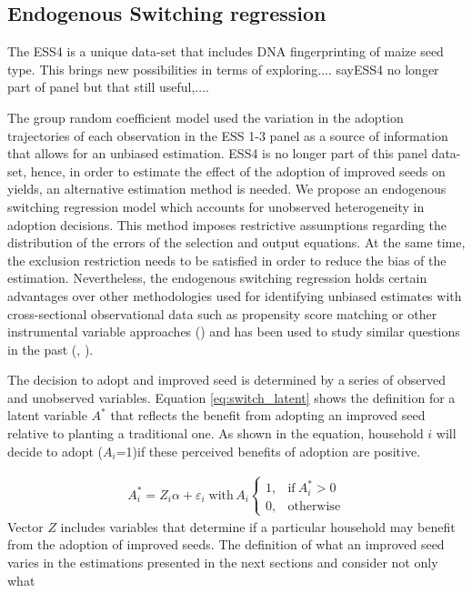 \documentclass{article}
\begin{document}
\subsection{Endogenous Switching regression}
The ESS4 is a unique data-set that includes DNA fingerprinting of maize seed type. This brings new possibilities in terms of exploring.... sayESS4 no longer part of panel but that still useful,.... \par
The group random coefficient model used the variation in the adoption trajectories of each observation in the ESS 1-3 panel as a source of information that allows for an unbiased estimation. ESS4 is no longer part of this panel data-set, hence, in order to estimate the effect of the adoption of improved seeds on yields, an alternative estimation method is needed. We propose an endogenous switching regression model which accounts for unobserved heterogeneity in adoption decisions. This method imposes restrictive assumptions regarding the distribution of the errors of the selection and output equations. At the same time, the exclusion restriction needs to be satisfied in order to reduce the bias of the estimation. Nevertheless, the endogenous switching regression holds certain advantages over other methodologies used for identifying unbiased estimates with cross-sectional observational data such as propensity score matching or other instrumental variable approaches (\cite{shiferaw2014adoption}) and has been used to study similar questions in the past (\citealt{falco2011does}, \citealt{kabunga2012yield}). \par
The decision to adopt and improved seed is determined by a series of observed and unobserved variables. Equation \ref{eq:switch_latent} shows the definition for a latent variable $A^*$ that reflects the benefit from adopting an improved seed relative to planting a traditional one. As shown in the equation, household $i$ will decide to adopt ($A_i$=1)if these perceived benefits of adoption are positive.

\begin{align}
A_i^*=Z_i\alpha+\varepsilon_i \; \text{with} \, A_i    \begin{cases}
      1, & \text{if}\ A_i^*>0 \\
      0, & \text{otherwise}
    \end{cases} \label{eq:switch_latent}
\end{align}
Vector $Z$ includes variables that determine if a particular household may benefit from the adoption of improved seeds. The definition of what an improved seed varies in the estimations presented in the next sections and consider not only what 
\end{document}
